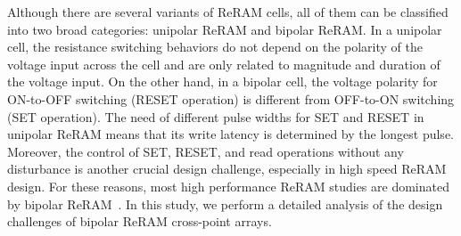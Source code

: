 Although there are several variants of ReRAM cells, all of them can be
classified into two broad categories: unipolar ReRAM and bipolar ReRAM. In
a unipolar cell, the resistance switching behaviors do not depend on the
polarity of the voltage input across the cell and are only related to magnitude
and duration of the voltage input. On the other hand, in a bipolar cell,
the voltage polarity for ON-to-OFF switching (RESET operation) is
different from OFF-to-ON switching (SET operation).
The need of different pulse widths for SET and RESET in unipolar ReRAM
means that its write latency is determined by the longest pulse. Moreover,
the control of SET, RESET, and read operations without any disturbance is
another crucial design challenge, especially in high speed ReRAM design.
For these reasons, most high performance ReRAM studies are dominated by
bipolar
ReRAM~\cite{ReRAM_IEDM2010_Kim,crossbar_Panasonic,ReRAM_ISSCC2011_Sheu,ReRAM_ISSCC2011_Otsuka}.
In this study, we perform a detailed analysis of the design challenges of
bipolar ReRAM cross-point arrays.

\vspace{-5pt}
